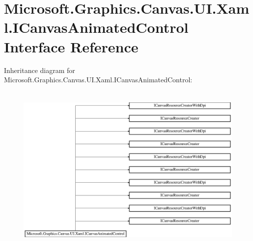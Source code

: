 \hypertarget{interface_microsoft_1_1_graphics_1_1_canvas_1_1_u_i_1_1_xaml_1_1_i_canvas_animated_control}{}\section{Microsoft.\+Graphics.\+Canvas.\+U\+I.\+Xaml.\+I\+Canvas\+Animated\+Control Interface Reference}
\label{interface_microsoft_1_1_graphics_1_1_canvas_1_1_u_i_1_1_xaml_1_1_i_canvas_animated_control}
Inheritance diagram for Microsoft.\+Graphics.\+Canvas.\+U\+I.\+Xaml.\+I\+Canvas\+Animated\+Control\+:\begin{figure}[H]
\begin{center}
\leavevmode
\includegraphics[height=8.438356cm]{interface_microsoft_1_1_graphics_1_1_canvas_1_1_u_i_1_1_xaml_1_1_i_canvas_animated_control}
\end{center}
\end{figure}
